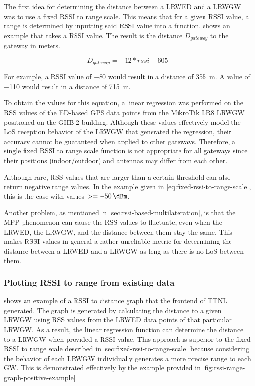 The first idea for determining the distance between a \acl{LRWED} and a \acl{LRWGW} was to use a fixed \ac{RSSI} to range scale.
This means that for a given \ac{RSSI} value, a range is determined by inputting said \ac{RSSI} value into a function.
 shows an example that takes a \ac{RSSI} value.
The result is the distance $D_{gateway}$ to the gateway in meters.

\begin{equation}\label{eq:fixed-rssi-to-range-scale}
    D_{gateway} = -12 * rssi - 605
\end{equation}

For example, a \ac{RSSI} value of \SI{-80}{\dBm} would result in a distance of \SI{355}{\meter}.
A value of \SI{-110}{\dBm} would result in a distance of \SI{715}{\meter}.

To obtain the values for this equation, a linear regression was performed on the \ac{RSS} values of the \acl{ED}-based GPS data points from the MikroTik LR8 \acl{LRWGW} positioned on the \ac{GHB} 2 building.
Although these values effectively model the \ac{LoS} reception behavior of the \acl{LRWGW} that generated the regression, their accuracy cannot be guaranteed when applied to other gateways.
Therefore, a single fixed \ac{RSSI} to range scale function is not appropriate for all gateways since their positions (indoor/outdoor) and antennas may differ from each other.

Although rare, \ac{RSS} values that are larger than a certain threshold can also return negative range values.
In the example given in \cref{eq:fixed-rssi-to-range-scale}, this is the case with values $>=\SI{-50}{\dBm}$.

Another problem, as mentioned in \cref{sec:rssi-based-multilateration}, is that the \ac{MPP} phenomenon can cause the \ac{RSS} values to fluctuate, even when the \acl{LRWED}, the \acl{LRWGW}, and the distance between them stay the same.
This makes RSSI values in general a rather unreliable metric for determining the distance between a \acl{LRWED} and a \acl{LRWGW} as long as there is no \ac{LoS} between them.

\subsubsection{Plotting \acs{RSSI} to range from existing data}\label{sec:plotting-rssi-to-range-from-existing-data}

 shows an example of a \ac{RSSI} to distance graph that the frontend of \ac{TTNL} generated.
The graph is generated by calculating the distance to a given \acl{LRWGW} using \ac{RSS} values from the \acl{LRWED} data points of that particular \acl{LRWGW}.
As a result, the linear regression function can determine the distance to a \acl{LRWGW} when provided a \ac{RSSI} value.
This approach is superior to the fixed \ac{RSSI} to range scale described in \cref{sec:fixed-rssi-to-range-scale} because considering the behavior of each \acl{LRWGW} individually generates a more precise range to each \acl{GW}.
This is demonstrated effectively by the example provided in \cref{fig:rssi-range-graph-positive-example}.

